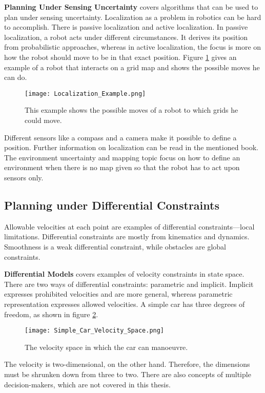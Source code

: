 \textbf{Planning Under Sensing Uncertainty} covers algorithms that can be used to plan under sensing uncertainty. Localization as a problem in robotics can be hard to accomplish. There is passive localization and active localization. In passive localization, a robot acts under different circumstances. It derives its position from probabilistic approaches, whereas in active localization, the focus is more on how the robot should move to be in that exact position. Figure \ref{fig:Localization Example} gives an example of a robot that interacts on a grid map and shows the possible moves he can do. \cite{planning_algorithms_steven_m_lavalle}
\begin{figure}[H]
    \centering
    \texttt{[image: Localization\_Example.png]}
    \caption{This example shows the possible moves of a robot to which grids he could move. \cite{planning_algorithms_steven_m_lavalle}}
    \label{fig:Localization Example}
\end{figure}

Different sensors like a compass and a camera make it possible to define a position. Further information on localization can be read in the mentioned book. The environment uncertainty and mapping topic focus on how to define an environment when there is no map given so that the robot has to act upon sensors only. \cite{planning_algorithms_steven_m_lavalle}

\pagebreak

\subsection{Planning under Differential Constraints} \label{sec:Planning under Differential Constraints}
Allowable velocities at each point are examples of differential constraints—local limitations. Differential constraints are mostly from kinematics and dynamics. Smoothness is a weak differential constraint, while obstacles are global constraints.

\textbf{Differential Models} covers examples of velocity constraints in state space. There are two ways of differential constraints: parametric and implicit. Implicit expresses prohibited velocities and are more general, whereas parametric representation expresses allowed velocities. A simple car has three degrees of freedom, as shown in figure \ref{fig:Simple Car Velocity Space}.
\begin{figure}[H]
    \centering
    \texttt{[image: Simple\_Car\_Velocity\_Space.png]}
    \caption{The velocity space in which the car can manoeuvre. \cite{planning_algorithms_steven_m_lavalle}}
    \label{fig:Simple Car Velocity Space}
\end{figure}
The velocity is two-dimensional, on the other hand. Therefore, the dimensions must be shrunken down from three to two. There are also concepts of multiple decision-makers, which are not covered in this thesis.

